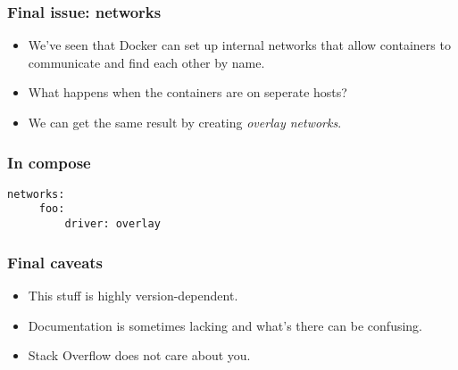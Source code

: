 \documentclass[10pt]{beamer}
\begin{document}
\begin{frame}
  \frametitle{Final issue: networks}
   
   \begin{itemize}
     \item We've seen that Docker can set up internal networks that allow containers to communicate and find each other by name.   
     \item What happens when the containers are on seperate hosts?
     \item We can get the same result by creating \emph{overlay networks}.
   \end{itemize}
\end{frame}

\begin{frame}[fragile]
    \frametitle{In compose}
     \begin{verbatim}
networks:
     foo:
         driver: overlay
     \end{verbatim}
 \end{frame}
 
 \begin{frame}
  \frametitle{Final caveats}
   
   \begin{itemize}
     \item This stuff is highly version-dependent.
     \item Documentation is sometimes lacking and what's there can be confusing.
     \item Stack Overflow does not care about you.
   \end{itemize}
\end{frame}    
\end{document}
